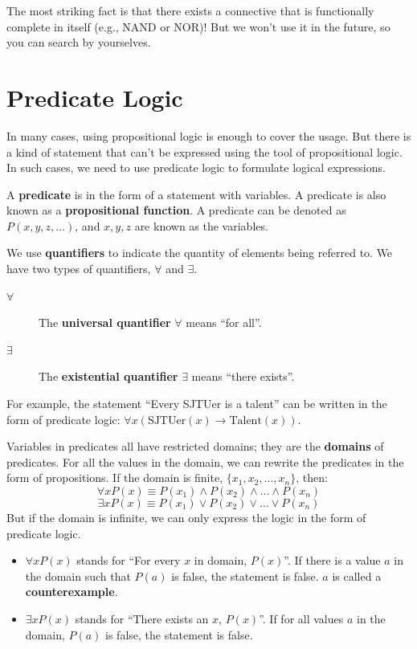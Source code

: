 \begin{remark}
The most striking fact is that there exists a connective that is functionally complete in itself (e.g., NAND or NOR)! But we won’t use it in the future, so you can search by yourselves.
\end{remark}

\section{Predicate Logic}
In many cases, using propositional logic is enough to cover the usage. But there is a kind of statement that can’t be expressed using the tool of propositional logic. In such cases, we need to use predicate logic to formulate logical expressions.

\begin{definition}[Predicate]
A \textbf{predicate} is in the form of a statement with variables. A predicate is also known as a \textbf{propositional function}. A predicate can be denoted as $P(x, y, z, \dots)$, and $x, y, z$ are known as the variables.
\end{definition}

\begin{definition}[Quantifiers]
We use \textbf{quantifiers} to indicate the quantity of elements being referred to. We have two types of quantifiers, $\forall$ and $\exists$.
\begin{description}
    \item[$\forall$] The \textbf{universal quantifier} $\forall$ means “for all”.
    \item[$\exists$] The \textbf{existential quantifier} $\exists$ means “there exists”.
\end{description}
\end{definition}

For example, the statement “Every SJTUer is a talent” can be written in the form of predicate logic: $\forall x (\text{SJTUer}(x) \to \text{Talent}(x))$.

Variables in predicates all have restricted domains; they are the \textbf{domains} of predicates. For all the values in the domain, we can rewrite the predicates in the form of propositions. If the domain is finite, $\{x_1, x_2, \dots, x_n\}$, then:
$$ \forall x P(x) \equiv P(x_1) \wedge P(x_2) \wedge \dots \wedge P(x_n) $$
$$ \exists x P(x) \equiv P(x_1) \vee P(x_2) \vee \dots \vee P(x_n) $$
But if the domain is infinite, we can only express the logic in the form of predicate logic.
\begin{itemize}
    \item $\forall x P(x)$ stands for “For every $x$ in domain, $P(x)$”. If there is a value $a$ in the domain such that $P(a)$ is false, the statement is false. $a$ is called a \textbf{counterexample}.
    \item $\exists x P(x)$ stands for “There exists an $x$, $P(x)$”. If for all values $a$ in the domain, $P(a)$ is false, the statement is false.
\end{itemize}


